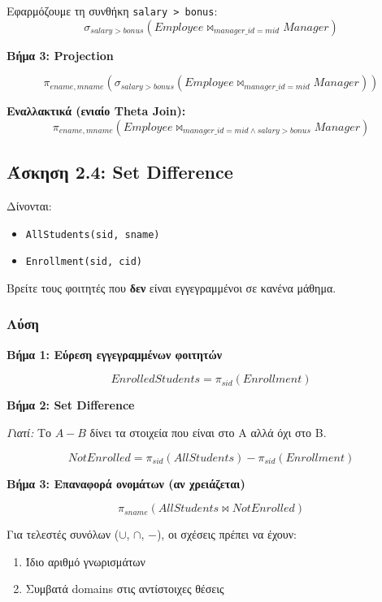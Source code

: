 Εφαρμόζουμε τη συνθήκη \texttt{salary > bonus}:
$$\sigma_{salary > bonus}(Employee \bowtie_{manager\_id = mid} Manager)$$

\textbf{Βήμα 3: Projection}

$$\pi_{ename, mname}(\sigma_{salary > bonus}(Employee \bowtie_{manager\_id = mid} Manager))$$

\textbf{Εναλλακτικά (ενιαίο Theta Join):}
$$\pi_{ename, mname}(Employee \bowtie_{manager\_id = mid \land salary > bonus} Manager)$$

\subsection{Άσκηση 2.4: Set Difference}

\begin{formulabox}[Εκφώνηση]
Δίνονται:
\begin{itemize}
    \item \texttt{AllStudents(sid, sname)}
    \item \texttt{Enrollment(sid, cid)}
\end{itemize}

Βρείτε τους φοιτητές που \textbf{δεν} είναι εγγεγραμμένοι σε κανένα μάθημα.
\end{formulabox}

\subsubsection*{Λύση}

\textbf{Βήμα 1: Εύρεση εγγεγραμμένων φοιτητών}

$$EnrolledStudents = \pi_{sid}(Enrollment)$$

\textbf{Βήμα 2: Set Difference}

\textit{Γιατί:} Το $A - B$ δίνει τα στοιχεία που είναι στο A αλλά όχι στο B.

$$NotEnrolled = \pi_{sid}(AllStudents) - \pi_{sid}(Enrollment)$$

\textbf{Βήμα 3: Επαναφορά ονομάτων (αν χρειάζεται)}

$$\pi_{sname}(AllStudents \bowtie NotEnrolled)$$

\begin{warningbox}
Για τελεστές συνόλων ($\cup$, $\cap$, $-$), οι σχέσεις πρέπει να έχουν:
\begin{enumerate}
    \item Ίδιο αριθμό γνωρισμάτων
    \item Συμβατά domains στις αντίστοιχες θέσεις
\end{enumerate}
\end{warningbox}

